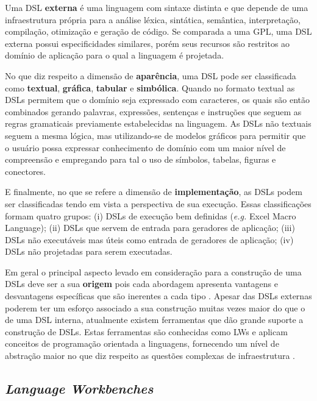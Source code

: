 Uma \ac{DSL} \textbf{externa} é uma linguagem com sintaxe distinta e que depende de uma infraestrutura própria para a análise léxica, sintática, semântica, interpretação, compilação, otimização e geração de código. 
Se comparada a uma \ac{GPL}, uma \ac{DSL} externa possui especificidades similares, porém seus recursos são restritos ao domínio de aplicação para o qual a linguagem é projetada.
    
No que diz respeito a dimensão de \textbf{aparência}, uma \ac{DSL} pode ser classificada como \textbf{textual}, \textbf{gráfica}, \textbf{tabular} e \textbf{simbólica}. 
Quando no formato textual as \acp{DSL} permitem que o domínio seja expressado com caracteres, os quais são então combinados gerando palavras, expressões, sentenças e instruções que seguem as regras gramaticais previamente estabelecidas na linguagem. 
As \acp{DSL} não textuais seguem a mesma lógica, mas utilizando-se de modelos gráficos para permitir que o usuário possa expressar conhecimento de domínio com um maior nível de compreensão e empregando para tal o uso de símbolos, tabelas, figuras e conectores. 
    
E finalmente, no que se refere a dimensão de \textbf{implementação}, as \acp{DSL} podem ser classificadas tendo em vista a perspectiva de sua execução. 
Essas classificações formam quatro grupos: 
(i) \acp{DSL} de execução bem definidas (\textit{e.g.} Excel Macro Language); 
(ii) \acp{DSL} que servem de entrada para geradores de aplicação; 
(iii) \acp{DSL} não executáveis mas úteis como entrada de geradores de aplicação; 
(iv) \acp{DSL} não projetadas para serem executadas.

Em geral o principal aspecto levado em consideração para a construção de uma \acp{DSL} deve ser a sua \textbf{origem} pois cada abordagem apresenta vantagens e desvantagens específicas que são inerentes a cada tipo \cite{Fowler:2010}. 
Apesar das \acp{DSL} externas poderem ter um esforço associado a sua construção muitas vezes maior do que o de uma \ac{DSL} interna, atualmente existem ferramentas que dão grande suporte a construção de \acp{DSL}. 
Estas ferramentas são conhecidas como \acp{LW} e aplicam conceitos de programação orientada a linguagens, fornecendo um nível de abstração maior no que diz respeito as questões complexas de infraestrutura \cite{Fowler:2005}.
    
    
\subsection{\textit{Language Workbenches}} \label{ssec:LW}

